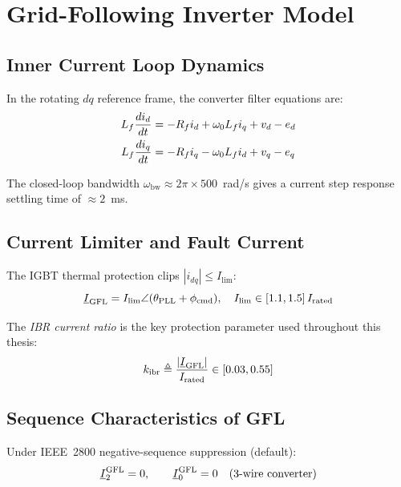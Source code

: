 \section{Grid-Following Inverter Model}
\label{sec:ch3_gfl}

\subsection{Inner Current Loop Dynamics}

In the rotating $dq$ reference frame, the converter filter equations are:
\begin{align}
  L_f \frac{di_d}{dt} &= -R_f i_d + \omega_0 L_f i_q + v_d - e_d \\
  L_f \frac{di_q}{dt} &= -R_f i_q - \omega_0 L_f i_d + v_q - e_q
\end{align}

The closed-loop bandwidth $\omega_\mathrm{bw} \approx 2\pi \times 500$~rad/s
gives a current step response settling time of $\approx 2$~ms.

\subsection{Current Limiter and Fault Current}

The IGBT thermal protection clips $|i_{dq}| \leq I_\mathrm{lim}$:
\begin{equation}
  \underline{I}_\mathrm{GFL} = I_\mathrm{lim}\angle(\theta_\mathrm{PLL} + \phi_\mathrm{cmd}),
  \quad I_\mathrm{lim} \in [1.1, 1.5]\,I_\mathrm{rated}
\end{equation}

The \emph{IBR current ratio} is the key protection parameter used throughout
this thesis:
\begin{equation}
  k_\mathrm{ibr} \triangleq \frac{|\underline{I}_\mathrm{GFL}|}{I_\mathrm{rated}}
  \in [0.03, 0.55]
  \label{eq:ch3_kibr_def}
\end{equation}

\subsection{Sequence Characteristics of GFL}

Under IEEE~2800 negative-sequence suppression (default):
\begin{equation}
  \underline{I}_2^\mathrm{GFL} = 0, \qquad
  \underline{I}_0^\mathrm{GFL} = 0 \quad \text{(3-wire converter)}
  \label{eq:ch3_gfl_seq}
\end{equation}

